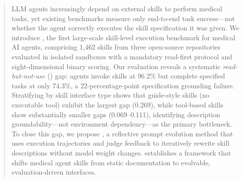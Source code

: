 \begin{abstract}
LLM agents increasingly depend on external skills to perform medical tasks, yet existing benchmarks measure only end-to-end task success---not whether the agent correctly executes the skill specification it was given.
We introduce \medskillbench, the first large-scale skill-level execution benchmark for medical AI agents, comprising 1,462 skills from three open-source repositories evaluated in isolated sandboxes with a mandatory read-first protocol and eight-dimensional binary scoring.
Our evaluation reveals a systematic \emph{read-but-not-use} (\rbu) gap: agents invoke skills at 96.2\% but complete specified tasks at only 74.3\%, a 22-percentage-point specification grounding failure.
Stratifying by skill interface type shows that guide-style skills (no executable tool) exhibit the largest gap (0.269), while tool-based skills show substantially smaller gaps (0.069--0.111), identifying description groundability---not environment dependency---as the primary bottleneck.
To close this gap, we propose \gepamed, a reflective prompt evolution method that uses execution trajectories and judge feedback to iteratively rewrite skill descriptions without model weight changes.
\medskille establishes a framework that shifts medical agent skills from static documentation to evolvable, evaluation-driven interfaces.
\end{abstract}
